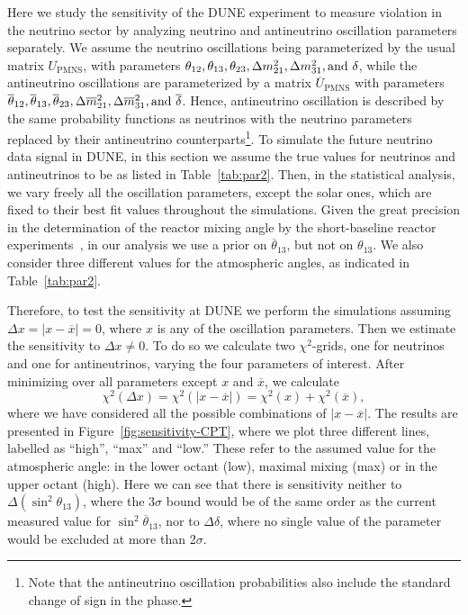 Here we study the sensitivity of the DUNE experiment to measure  violation in the neutrino sector by analyzing neutrino and antineutrino oscillation parameters separately. We assume the neutrino oscillations being parameterized by the usual  matrix $U_{\text{PMNS}}$, with parameters $\theta_{12},\theta_{13},\theta_{23},\Delta m_{21}^2,\Delta m_{31}^2, {\rm and}~\delta$, while the antineutrino oscillations are parameterized by a matrix $\overline{U}_{\text{PMNS}}$ with parameters $\overline{\theta}_{12},\overline{\theta}_{13},\overline{\theta}_{23},\Delta \overline{m}_{21}^2,\Delta \overline{m}_{31}^2, {\rm and}~\overline{\delta}$. Hence, antineutrino oscillation is described  by the same probability functions as neutrinos with the neutrino parameters replaced by their antineutrino counterparts\footnote{Note that the antineutrino oscillation probabilities also include the standard change of sign in the  phase.}. 
To simulate the future neutrino data signal in DUNE, in this section we assume the true values for neutrinos and antineutrinos to be as listed %
in Table~\ref{tab:par2}.
Then, in the statistical analysis, we vary freely all the oscillation parameters, except the solar ones, which are fixed to their best fit values throughout the simulations. Given the great precision in the determination of the reactor mixing angle by the short-baseline reactor experiments~\cite{An:2016ses,RENO:2015ksa,Abe:2014bwa}, in our analysis we use a prior on $\overline{\theta}_{13}$, but not on $\theta_{13}$. We also consider three different values for the atmospheric angles, as indicated in Table~\ref{tab:par2}. 

Therefore, to test the sensitivity at DUNE we perform the simulations assuming $\Delta x = |x-\overline{x}| = 0$, where $x$ is any of the oscillation parameters. Then we estimate the sensitivity to $\Delta x\neq 0$. To do so we calculate two $\chi^2$-grids, one for neutrinos and one for antineutrinos, varying the four parameters of interest. After minimizing over all parameters except $x$ and $\overline{x}$, we calculate 
%
\begin{equation}
 \chi^2(\Delta x) = \chi^2(|x-\overline{x}|) = \chi^2(x)+\chi^2(\overline{x}),
 \label{eq:chi2-nu-nubar}
\end{equation}
%
where we have considered all the possible combinations of $|x-\overline{x}|$. The results are presented in Figure~\ref{fig:sensitivity-CPT}, where we plot three different lines, labelled as ``high'', ``max'' and ``low.'' These refer to the assumed value for the atmospheric angle: in the lower octant (low), maximal mixing (max) or in the upper octant (high). Here we can see that there is sensitivity neither to $\Delta(\sin^2\theta_{13})$, where the 3$\sigma$ bound would be of the same order %
as the current measured value for $\sin^2\overline{\theta}_{13}$, nor to $\Delta\delta$, where no single value of the parameter would be excluded at more than 2$\sigma$.

